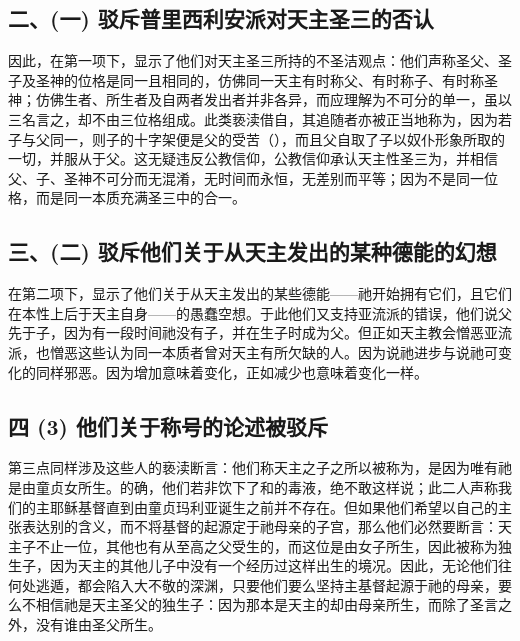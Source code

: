 
\subsection{二、(一) 驳斥普里西利安派对天主圣三的否认}

因此，在第一项下，显示了他们对天主圣三所持的不圣洁观点：他们声称圣父、圣子及圣神的位格是同一且相同的，仿佛同一天主有时称父、有时称子、有时称圣神；仿佛生者、所生者及自两者发出者并非各异，而应理解为不可分的单一，虽以三名言之，却不由三位格组成。此类亵渎借自，其追随者亦被正当地称为，因为若子与父同一，则子的十字架便是父的受苦（），而且父自取了子以奴仆形象所取的一切，并服从于父。这无疑违反公教信仰，公教信仰承认天主性圣三为，并相信父、子、圣神不可分而无混淆，无时间而永恒，无差别而平等；因为不是同一位格，而是同一本质充满圣三中的合一。\par


\subsection{三、(二) 驳斥他们关于从天主发出的某种德能的幻想}

在第二项下，显示了他们关于从天主发出的某些德能——祂开始拥有它们，且它们在本性上后于天主自身——的愚蠢空想。于此他们又支持亚流派的错误，他们说父先于子，因为有一段时间祂没有子，并在生子时成为父。但正如天主教会憎恶亚流派，也憎恶这些认为同一本质者曾对天主有所欠缺的人。因为说祂进步与说祂可变化的同样邪恶。因为增加意味着变化，正如减少也意味着变化一样。\par


\subsection{四 (3) 他们关于称号的论述被驳斥}

第三点同样涉及这些人的亵渎断言：他们称天主之子之所以被称为，是因为唯有祂是由童贞女所生。的确，他们若非饮下了和的毒液，绝不敢这样说；此二人声称我们的主耶稣基督直到由童贞玛利亚诞生之前并不存在。但如果他们希望以自己的主张表达别的含义，而不将基督的起源定于祂母亲的子宫，那么他们必然要断言：天主子不止一位，其他也有从至高之父受生的，而这位是由女子所生，因此被称为独生子，因为天主的其他儿子中没有一个经历过这样出生的境况。因此，无论他们往何处逃遁，都会陷入大不敬的深渊，只要他们要么坚持主基督起源于祂的母亲，要么不相信祂是天主圣父的独生子：因为那本是天主的却由母亲所生，而除了圣言之外，没有谁由圣父所生。\par

